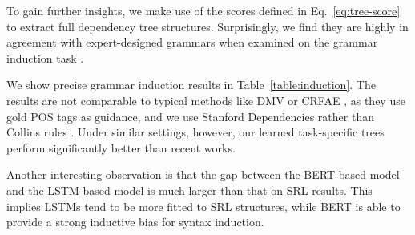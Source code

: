 \documentclass[11pt]{article}
\begin{document}
To gain further insights, we make use of the scores defined in Eq.~\ref{eq:tree-score} to extract full dependency tree structures.
Surprisingly, we find they are highly in agreement with expert-designed grammars \cite{marcus-etal-1993-building} when examined on the grammar induction task \cite{klein-manning-2004-corpus}.

We show precise grammar induction results in Table~\ref{table:induction}.
The results are not comparable to typical methods like DMV \cite{klein-manning-2004-corpus} or CRFAE \cite{cai-etal-2017-crf}, as they use gold POS tags as guidance, and we use Stanford Dependencies rather than Collins rules \cite{collins-2003-head}.
Under similar settings, however, our learned task-specific trees perform significantly better than recent works.

Another interesting observation is that the gap between the BERT-based model and the LSTM-based model is much larger than that on SRL results.
This implies LSTMs tend to be more fitted to SRL structures, while BERT is able to provide a strong inductive bias for syntax induction.
\end{document}
